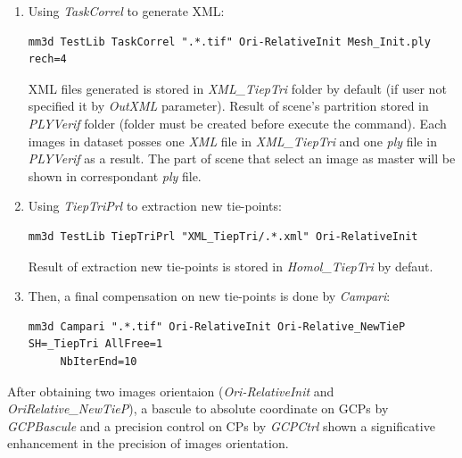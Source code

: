 \begin{enumerate}
\item Using \textit{TaskCorrel} to generate XML: 
\begin{verbatim}
mm3d TestLib TaskCorrel ".*.tif" Ori-RelativeInit Mesh_Init.ply rech=4
\end{verbatim}



XML files generated is stored in \textit{XML\_TiepTri} folder by default (if user not specified it by \textit{OutXML} parameter). 
Result of scene's partrition stored in \textit{PLYVerif} folder (folder must be created before execute the command). 
Each images in dataset posses one \textit{XML} file in \textit{XML\_TiepTri} and one \textit{ply} file in \textit{PLYVerif} as a result. 
The part of scene that select an image as master will be shown in correspondant \textit{ply} file.

\item Using \textit{TiepTriPrl} to extraction new tie-points: 
\begin{verbatim}
mm3d TestLib TiepTriPrl "XML_TiepTri/.*.xml" Ori-RelativeInit
\end{verbatim}
Result of extraction new tie-points is stored in \textit{Homol\_TiepTri} by defaut.


\item Then, a final compensation on new tie-points is done by \textit{Campari}:
\begin{verbatim}
mm3d Campari ".*.tif" Ori-RelativeInit Ori-Relative_NewTieP SH=_TiepTri AllFree=1
     NbIterEnd=10
\end{verbatim}
\end{enumerate}

After obtaining two images orientaion (\textit{Ori-RelativeInit} and \textit{Ori\-Relative\_NewTieP}), a bascule to absolute coordinate on GCPs by \textit{GCPBascule} and a precision control on CPs by \textit{GCPCtrl} shown a significative enhancement in the precision of images orientation.





